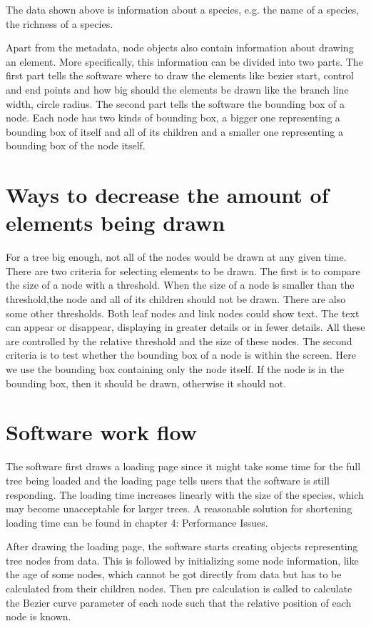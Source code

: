 \documentclass[MSc]{icldt}
\begin{document}
The data shown above is information about a species, e.g. the name of a species, the richness of a species. 

Apart from the metadata, node objects also contain information about drawing an element. More specifically, this information can be divided into two parts. The first part tells the software where to draw the elements like bezier start, control and end points and how big should the elements be drawn like the branch line width, circle radius. The second part tells the software the bounding box of a node. Each node has two kinds of bounding box, a bigger one representing a bounding box of itself and all of its children and a smaller one representing a bounding box of the node itself. 


\section{Ways to decrease the amount of elements being drawn}

For a tree big enough, not all of the nodes would be drawn at any given time. There are two criteria for selecting elements to be drawn. The first is to compare the size of a node with a threshold. When the size of a node is smaller than the threshold,the node and all of its children should not be drawn. There are also some other thresholds. Both leaf nodes and link nodes could show text. The text can appear or disappear, displaying in greater details or in fewer details. All these are controlled by the relative threshold and the size of these nodes. The second criteria is to test whether the bounding box of a node is within the screen. Here we use the bounding box containing only the node itself. If the node is in the bounding box, then it should be drawn, otherwise it should not. 

\section{Software work flow}

The software first draws a loading page since it might take some time for the full tree being loaded and the loading page tells users that the software is still responding. The loading time increases linearly with the size of the species, which may become unacceptable for larger trees. A reasonable solution for shortening loading time can be found in chapter 4: Performance Issues. 

After drawing the loading page, the software starts creating objects representing tree nodes from data. This is followed by initializing some node information, like the age of some nodes, which cannot be got directly from data but has to be calculated from their children nodes. Then pre calculation is called to calculate the Bezier curve parameter of each node such that the relative position of each node is known. 
\end{document}
